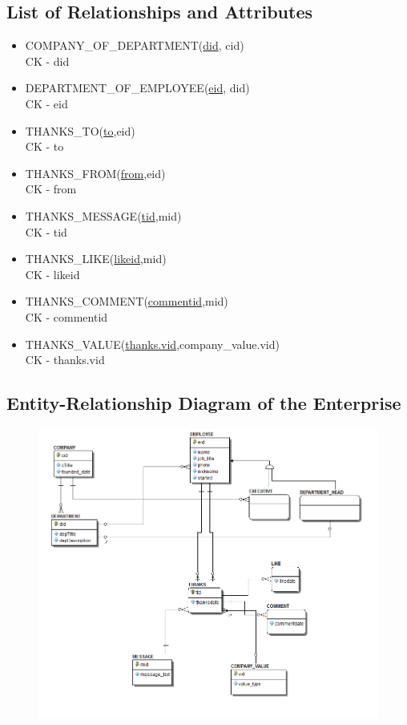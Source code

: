 \documentclass[11pt]{report}
\begin{document}
\subsection{List of Relationships and Attributes}
\begin{itemize}
\item COMPANY\_OF\_DEPARTMENT(\underline{did}, cid) \\
CK - did \\
\item DEPARTMENT\_OF\_EMPLOYEE(\underline{eid}, did) \\
CK - eid \\
\item THANKS\_TO(\underline{to},eid) \\
CK - to\\
\item THANKS\_FROM(\underline{from},eid) \\
CK - from\\
\item THANKS\_MESSAGE(\underline{tid},mid) \\
CK - tid\\
\item THANKS\_LIKE(\underline{likeid},mid) \\
CK - likeid\\
\item THANKS\_COMMENT(\underline{commentid},mid) \\
CK - commentid\\
\item THANKS\_VALUE(\underline{thanks.vid},company\_value.vid) \\
CK - thanks.vid\\
\end{itemize}
\clearpage

\subsection{Entity-Relationship Diagram of the Enterprise}

\begin{figure}[!htb]
\centering
\includegraphics[scale=.7]{./images/ERD11-4.png}
\end{figure}
\clearpage
\end{document}
